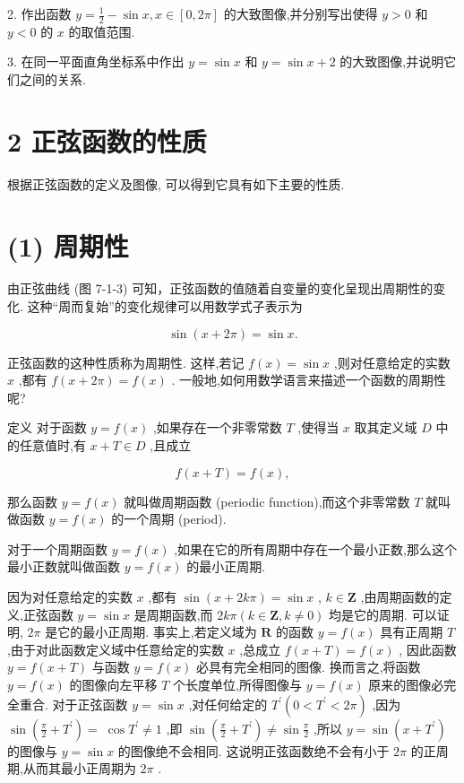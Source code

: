 \documentclass[10pt]{article}
\begin{document}
2. 作出函数 \(y = \frac{1}{2} - \sin x,x \in  \left\lbrack  {0,{2\pi }}\right\rbrack\) 的大致图像,并分别写出使得 \(y > 0\) 和 \(y < 0\) 的 \(x\) 的取值范围.

3. 在同一平面直角坐标系中作出 \(y = \sin x\) 和 \(y = \sin x + 2\) 的大致图像,并说明它们之间的关系.

\section*{2 正弦函数的性质}

根据正弦函数的定义及图像, 可以得到它具有如下主要的性质.

\section*{(1) 周期性}

由正弦曲线 (图 7-1-3) 可知，正弦函数的值随着自变量的变化呈现出周期性的变化. 这种“周而复始”的变化规律可以用数学式子表示为

\[
\sin \left( {x + {2\pi }}\right)  = \sin x.
\]

正弦函数的这种性质称为周期性. 这样,若记 \(f\left( x\right)  = \sin x\) ,则对任意给定的实数 \(x\) ,都有 \(f\left( {x + {2\pi }}\right)  = f\left( x\right)\) . 一般地,如何用数学语言来描述一个函数的周期性呢?

定义 对于函数 \(y = f\left( x\right)\) ,如果存在一个非零常数 \(T\) ,使得当 \(x\) 取其定义域 \(D\) 中的任意值时,有 \(x + T \in  D\) ,且成立

\[
f\left( {x + T}\right)  = f\left( x\right) ,
\]

那么函数 \(y = f\left( x\right)\) 就叫做周期函数 (periodic function),而这个非零常数 \(T\) 就叫做函数 \(y = f\left( x\right)\) 的一个周期 (period).

对于一个周期函数 \(y = f\left( x\right)\) ,如果在它的所有周期中存在一个最小正数,那么这个最小正数就叫做函数 \(y = f\left( x\right)\) 的最小正周期.

因为对任意给定的实数 \(x\) ,都有 \(\sin \left( {x + {2k\pi }}\right)  = \sin x\) , \(k \in  \mathbf{Z}\) ,由周期函数的定义,正弦函数 \(y = \sin x\) 是周期函数,而 \({2k\pi }\left( {k \in  \mathbf{Z},k \neq  0}\right)\) 均是它的周期. 可以证明, \({2\pi }\) 是它的最小正周期. 事实上,若定义域为 \(\mathbf{R}\) 的函数 \(y = f\left( x\right)\) 具有正周期 \(T\) ,由于对此函数定义域中任意给定的实数 \(x\) ,总成立 \(f\left( {x + T}\right)  = f\left( x\right)\) , 因此函数 \(y = f\left( {x + T}\right)\) 与函数 \(y = f\left( x\right)\) 必具有完全相同的图像. 换而言之,将函数 \(y = f\left( x\right)\) 的图像向左平移 \(T\) 个长度单位,所得图像与 \(y = f\left( x\right)\) 原来的图像必完全重合. 对于正弦函数 \(y = \sin x\) ,对任何给定的 \({T}^{\prime }\left( {0 < {T}^{\prime } < {2\pi }}\right)\) ,因为 \(\sin \left( {\frac{\pi }{2} + {T}^{\prime }}\right)  = \; \cos {T}^{\prime } \neq  1\) ,即 \(\sin \left( {\frac{\pi }{2} + {T}^{\prime }}\right)  \neq  \sin \frac{\pi }{2}\) ,所以 \(y = \sin \left( {x + {T}^{\prime }}\right)\) 的图像与 \(y = \sin x\) 的图像绝不会相同. 这说明正弦函数绝不会有小于 \({2\pi }\) 的正周期,从而其最小正周期为 \({2\pi }\) .
\end{document}
